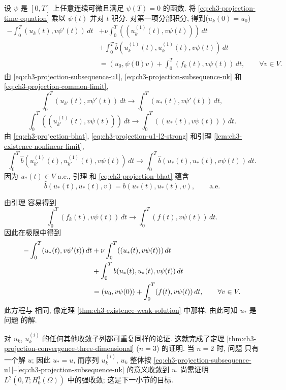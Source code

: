 设 $\psi$ 是 $[0,T]$ 上任意连续可微且满足 $\psi(T)=0$ 的函数. 将 \eqref{eq:ch3-projection-time-equation} 乘以 $\psi(t)$ 并对 $t$ 积分. 对第一项分部积分, 得到($u_k(0)=u_0$)
\begin{align*}
-\int_0^T(u_k(t),v\psi'(t))\,dt
&+\nu\int_0^T((u_k^{(1)}(t),v\psi(t)))\,dt\\
&+\int_0^T\widehat b(u_k^{(1)}(t),u_k^{(1)}(t),v\psi(t))\,dt\\
&=(u_0,\psi(0)v)+\int_0^T(f_k(t),v\psi(t))\,dt,
\qquad\forall v\in V.
\end{align*}
由 \eqref{eq:ch3-projection-subsequence-u1}, \eqref{eq:ch3-projection-subsequence-uk} 和 \eqref{eq:ch3-projection-common-limit},
\[
\int_0^T(u_{k'}(t),v\psi'(t))\,dt
\longrightarrow\int_0^T(u_*(t),v\psi'(t))\,dt,
\]
\[
\int_0^T((u_{k'}^{(1)}(t),v\psi(t)))\,dt
\longrightarrow\int_0^T((u_*(t),v\psi(t)))\,dt.
\]
由 \eqref{eq:ch3-projection-bhat}, \eqref{eq:ch3-projection-u1-l2-strong} 和引理 \ref{lem:ch3-existence-nonlinear-limit},
\[
\int_0^T\widehat b(u_{k'}^{(1)}(t),u_{k'}^{(1)}(t),v\psi(t))\,dt
\longrightarrow\int_0^T\widehat b(u_*(t),u_*(t),v\psi(t))\,dt.
\]
因为 $u_*(t)\in V$ a.e., 引理  和 \eqref{eq:ch3-projection-bhat} 蕴含
\[
\widehat b(u_*(t),u_*(t),v)=b(u_*(t),u_*(t),v),\qquad\text{a.e.}
\]

\hypertarget{chapter-03-page-290}{}
由引理  容易得到
\[
\int_0^T(f_k(t),v\psi(t))\,dt
\longrightarrow\int_0^T(f(t),v\psi(t))\,dt.
\]
因此在极限中得到
\begin{align}
-\int_0^T(u_*(t),v\psi'(t))\,dt
&+\nu\int_0^T((u_*(t),v\psi(t)))\,dt \notag\\
&+\int_0^Tb(u_*(t),u_*(t),v\psi(t))\,dt \notag\\
&=(u_0,v\psi(0))+\int_0^T(f(t),v\psi(t))\,dt,
\qquad\forall v\in V.
\label{eq:ch3-projection-limit-weak-form}
\end{align}
此方程与  相同, 像定理 \ref{thm:ch3-existence-weak-solution} 中那样, 由此可知 $u_*$ 是问题  的解.

对 $u_k$, $u_k^{(i)}$ 的任何其他收敛子列都可重复同样的论证. 这就完成了定理 \ref{thm:ch3-projection-convergence-three-dimensional} ($n=3$) 的证明. 当 $n=2$ 时, 问题  只有一个解 $u$; 因此 $u_*=u$, 而序列 $u_k^{(i)}$, $u_k$ 整体按 \eqref{eq:ch3-projection-subsequence-u1}--\eqref{eq:ch3-projection-subsequence-uk} 的意义收敛到 $u$. 尚需证明 $L^2(0,T;H_0^1(\Omega))$ 中的强收敛; 这是下一小节的目标.

